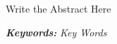 \thispagestyle{empty} 
\noindent\makebox[\linewidth]{\rule{0.7\paperwidth}{1.5pt}}


Write the Abstract Here


\textbf{\textit{Keywords:}} \textit{Key Words}

